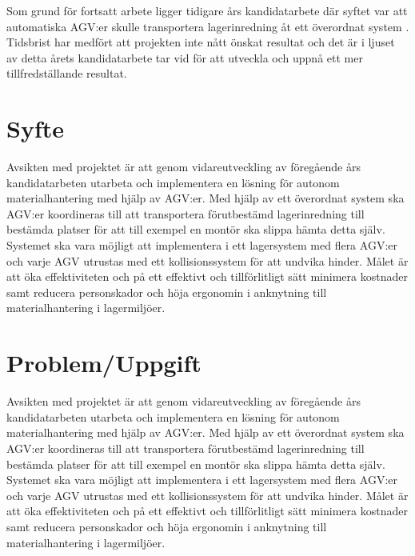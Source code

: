 \documentclass[a4paper,11pt]{article}
\begin{document}
Som grund för fortsatt arbete ligger tidigare års kandidatarbete där syftet
var att automatiska AGV:er skulle transportera lagerinredning åt ett
överordnat system \cite{qr,laser}. Tidsbrist har medfört att projekten inte
nått önskat resultat och det är i ljuset av detta årets kandidatarbete tar
vid för att utveckla och uppnå ett mer tillfredställande resultat. 


\section{Syfte}
Avsikten med projektet är att genom vidareutveckling av föregående års
kandidatarbeten utarbeta och implementera en lösning för autonom
materialhantering med hjälp av AGV:er. Med hjälp av ett överordnat system
ska AGV:er koordineras till att transportera förutbestämd lagerinredning
till bestämda platser för att till exempel en montör ska slippa hämta detta
själv. Systemet ska vara möjligt att implementera i ett lagersystem med
flera AGV:er och varje AGV utrustas med ett kollisionssystem för att
undvika hinder. Målet är att öka effektiviteten och på ett effektivt och
tillförlitligt sätt minimera kostnader samt reducera personskador och höja
ergonomin i anknytning till materialhantering i lagermiljöer. 


\section{Problem/Uppgift}
Avsikten med projektet är att genom vidareutveckling av föregående års
kandidatarbeten utarbeta och implementera en lösning för autonom
materialhantering med hjälp av AGV:er. Med hjälp av ett överordnat system
ska AGV:er koordineras till att transportera förutbestämd lagerinredning
till bestämda platser för att till exempel en montör ska slippa hämta detta
själv. Systemet ska vara möjligt att implementera i ett lagersystem med
flera AGV:er och varje AGV utrustas med ett kollisionssystem för att
undvika hinder. Målet är att öka effektiviteten och på ett effektivt och
tillförlitligt sätt minimera kostnader samt reducera personskador och höja
ergonomin i anknytning till materialhantering i lagermiljöer. 
\end{document}
